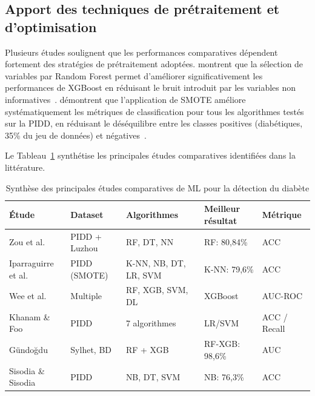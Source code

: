\subsection{Apport des techniques de prétraitement et d'optimisation}

Plusieurs études soulignent que les performances comparatives dépendent fortement des
stratégies de prétraitement adoptées. \citeauthor{gundogdu2023} montrent que la sélection
de variables par Random Forest permet d'améliorer significativement les performances de
XGBoost en réduisant le bruit introduit par les variables non informatives~\citep{gundogdu2023}.
\citeauthor{iparraguirre2023} démontrent que l'application de SMOTE améliore systématiquement
les métriques de classification pour tous les algorithmes testés sur la PIDD, en réduisant
le déséquilibre entre les classes positives (diabétiques, 35\% du jeu de données) et
négatives~\citep{iparraguirre2023}.

Le Tableau~\ref{tab:comparaison_etudes} synthétise les principales études comparatives
identifiées dans la littérature.

\begin{table}[htbp]
	\centering
	\caption{Synthèse des principales études comparatives de ML pour la détection du diabète}
	\label{tab:comparaison_etudes}
	\small
	\begin{tabular}{p{2.8cm} p{2.8cm} p{2.5cm} p{3cm} p{2cm}}
		\hline
		\textbf{Étude} & \textbf{Dataset} & \textbf{Algorithmes} & \textbf{Meilleur résultat} & \textbf{Métrique} \\
		\hline
		Zou et al. \cite{zou2018} & PIDD + Luzhou & RF, DT, NN & RF: 80,84\% & ACC \\
		\hline
		Iparraguirre et al. \cite{iparraguirre2023} & PIDD (SMOTE) & K-NN, NB, DT, LR, SVM & K-NN: 79,6\% & ACC \\
		\hline
		Wee et al. \cite{wee2024} & Multiple & RF, XGB, SVM, DL & XGBoost & AUC-ROC \\
		\hline
		Khanam \& Foo \cite{khanam2021} & PIDD & 7 algorithmes & LR/SVM & ACC / Recall \\
		\hline
		Gündoğdu \cite{gundogdu2023} & Sylhet, BD & RF + XGB & RF-XGB: 98,6\% & AUC \\
		\hline
		Sisodia \& Sisodia \cite{sisodia2018} & PIDD & NB, DT, SVM & NB: 76,3\% & ACC \\
		\hline
	\end{tabular}
\end{table}

